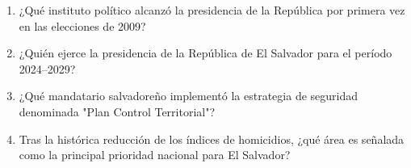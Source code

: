 \documentclass[10pt,a4paper]{article}
\begin{document}
\begin{enumerate}[label=\textbf{\arabic*.}]
\begin{enumerate}[label=\textbf{\Alph*)}]
\end{enumerate}
\vspace{0.15cm}
\item ¿Qué instituto político alcanzó la presidencia de la República por primera vez en las elecciones de 2009?
\begin{enumerate}[label=\textbf{\Alph*)}]
\end{enumerate}
\vspace{0.15cm}
\item ¿Quién ejerce la presidencia de la República de El Salvador para el período 2024–2029?
\begin{enumerate}[label=\textbf{\Alph*)}]
\end{enumerate}
\vspace{0.15cm}
\item ¿Qué mandatario salvadoreño implementó la estrategia de seguridad denominada "Plan Control Territorial"?
\begin{enumerate}[label=\textbf{\Alph*)}]
\end{enumerate}
\vspace{0.15cm}
\item Tras la histórica reducción de los índices de homicidios, ¿qué área es señalada como la principal prioridad nacional para El Salvador?
\begin{enumerate}[label=\textbf{\Alph*)}]

\end{enumerate}
\end{enumerate}
\end{document}
